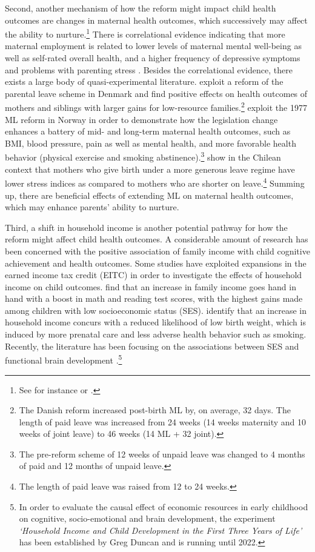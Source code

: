 \documentclass[11pt, a4paper, draft]{article} %
\begin{document}
Second, another mechanism of how the reform might impact child health outcomes are
changes in maternal health outcomes, which successively may affect the ability to nurture.\footnote{See for instance \cite{patel2004} or \cite{frech2011maternal}.} There is correlational evidence indicating that more maternal employment is related to lower levels of maternal mental well-being as well as self-rated overall health, and a higher frequency of depressive symptoms and problems with parenting stress \citep{chatterji2005does,Chatterji2013}. Besides the correlational evidence, there exists a large body of quasi-experimental literature. \cite{beuchert2016} exploit a reform of the parental leave scheme in Denmark and find positive effects on health outcomes of mothers and siblings with larger gains for low-resource families.\footnote{The Danish reform increased post-birth ML by, on average, 32 days. The length of paid leave was increased from 24 weeks (14 weeks maternity and 10 weeks of joint leave) to 46 weeks (14 ML + 32 joint).} \cite{butikofer2018impact} exploit the 1977 ML reform in Norway in order to demonstrate how the legislation change enhances a battery of mid- and long-term maternal health outcomes, such as BMI, blood pressure, pain as well as mental health, and more favorable health behavior (physical exercise and smoking abstinence).\footnote{The pre-reform scheme of 12 weeks of unpaid leave was changed to 4 months of paid and 12 months of unpaid leave.} \cite{albagli2018} show in the Chilean context that mothers who give birth under a more generous leave regime have lower stress indices as compared to mothers who are shorter on leave.\footnote{The length of paid leave was raised from 12 to 24 weeks.} Summing up, there are beneficial effects of extending ML on maternal health outcomes, which may enhance parents' ability to nurture.



Third, a shift in household income is another potential pathway for how the reform might affect child health outcomes. A considerable amount of research has been concerned with the positive association of family income with child cognitive achievement and health outcomes. Some studies have exploited expansions in the earned income tax credit (EITC) in order to investigate the effects of household income on child outcomes. \cite{dahl2012impact} find that an increase in family income goes hand in hand with a boost in math and reading test scores, with the highest gains made among children with low socioeconomic status (SES). \cite{hoynes2015income} identify that an increase in household income concurs with a reduced likelihood of low birth weight, which is induced by more prenatal care and less adverse health behavior such as smoking. Recently, the literature has been focusing on the associations between SES and functional brain development \citep{tomalski2013}.\footnote{In order to evaluate the causal effect of economic resources in early childhood on cognitive, socio-emotional and brain development, the experiment \textit{`Household Income and Child Development in the First Three Years of Life'} has been established by Greg Duncan and is running until 2022.} 
\end{document}
